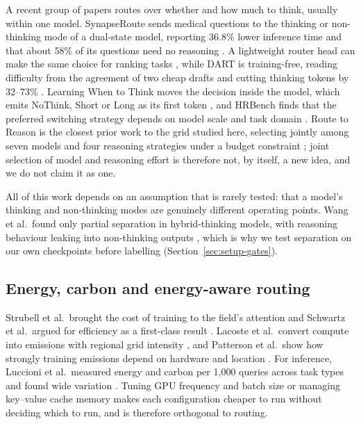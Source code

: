 A recent group of papers routes over whether and how much to think, usually
within one model. SynapseRoute sends medical questions to the thinking or
non-thinking mode of a dual-state model, reporting 36.8\% lower inference
time and that about 58\% of its questions need no reasoning
\cite{zhang2025synapseroute}. A lightweight router head can make the same
choice for ranking tasks \cite{guo2026thinkwhenneeded}, while DART is
training-free, reading difficulty from the agreement of two cheap drafts and
cutting thinking tokens by 32--73\% \cite{lee2026dart}. Learning
When to Think moves the decision inside the model, which emits NoThink, Short
or Long as its first token \cite{kassenaar2026learningwhentothink}, and
HRBench finds that the preferred switching strategy depends on model scale
and task domain \cite{ning2026hrbench}. Route to Reason is the closest prior
work to the grid studied here, selecting jointly among seven models and four
reasoning strategies under a budget constraint \cite{pan2026routetoreason};
joint selection of model and reasoning effort is therefore not, by itself, a
new idea, and we do not claim it as one.

All of this work depends on an assumption that is rarely tested: that a
model's thinking and non-thinking modes are genuinely different operating
points. Wang et al.\ found only partial separation in hybrid-thinking models,
with reasoning behaviour leaking into non-thinking outputs
\cite{wang2025demystifying}, which is why we test separation on our own
checkpoints before labelling (Section~\ref{sec:setup-gates}).

\subsection{Energy, carbon and energy-aware routing}
\label{sec:related-energy}

Strubell et al.\ brought the cost of training to the field's attention
\cite{strubell2019energy} and Schwartz et al.\ argued for efficiency as a
first-class result \cite{schwartz2020greenai}. Lacoste et al.\ convert
compute into emissions with regional grid intensity
\cite{lacoste2019quantifying}, and Patterson et al.\ show how strongly
training emissions depend on hardware and location \cite{patterson2021carbon}.
For inference, Luccioni et al.\ measured energy and carbon per 1{,}000
queries across task types and found wide variation
\cite{luccioni2024powerhungry}. Tuning GPU frequency and batch size
\cite{xu2025camel} or managing key--value cache memory \cite{kwon2023vllm}
makes each configuration cheaper to run without deciding which to run, and is
therefore orthogonal to routing.

